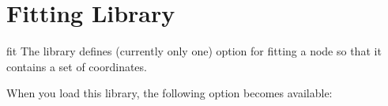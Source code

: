 %
%
%


\section{Fitting Library}
\label{section-library-fit}

\begin{tikzlibrary}{fit}
  The library defines (currently only one) option for fitting a node
  so that it contains a set of coordinates.
\end{tikzlibrary}

When you load this library, the following option becomes available:

